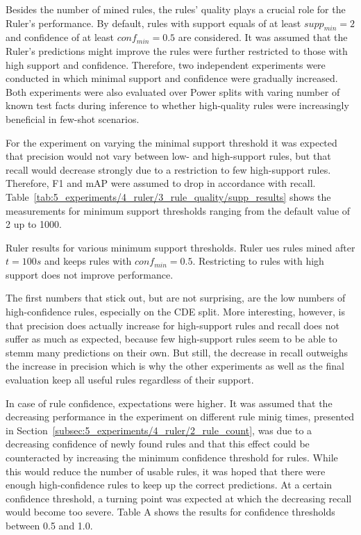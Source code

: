 Besides the number of mined rules, the rules' quality plays a crucial role for the Ruler's performance. By default, rules with support equals of at least $supp_{min} = 2$ and confidence of at least $conf_{min} = 0.5$ are considered. It was assumed that the Ruler's predictions might improve the rules were further restricted to those with high support and confidence. Therefore, two independent experiments were conducted in which minimal support and confidence were gradually increased. Both experiments were also evaluated over Power splits with varing number of known test facts during inference to whether high-quality rules were increasingly beneficial in few-shot scenarios.

For the experiment on varying the minimal support threshold it was expected that precision would not vary between low- and high-support rules, but that recall would decrease strongly due to a restriction to few high-support rules. Therefore, F1 and mAP were assumed to drop in accordance with recall. Table~\ref{tab:5_experiments/4_ruler/3_rule_quality/supp_results} shows the measurements for minimum support thresholds ranging from the default value of 2 up to 1000.

\begin{table}
    \centering
    
    \caption{Ruler results for various minimum support thresholds. Ruler ues rules mined after $t = 100s$ and keeps rules with $conf_{min} = 0.5$. Restricting to rules with high support does not improve performance.}
    \label{tab:5_experiments/4_ruler/3_rule_quality/supp_results}
\end{table}

The first numbers that stick out, but are not surprising, are the low numbers of high-confidence rules, especially on the CDE split. More interesting, however, is that precision does actually increase for high-support rules and recall does not suffer as much as expected, because few high-support rules seem to be able to stemm many predictions on their own. But still, the decrease in recall outweighs the increase in precision which is why the other experiments as well as the final evaluation keep all useful rules regardless of their support.

In case of rule confidence, expectations were higher. It was assumed that the decreasing performance in the experiment on different rule minig times, presented in Section~\ref{subsec:5_experiments/4_ruler/2_rule_count}, was due to a decreasing confidence of newly found rules and that this effect could be counteracted by increasing the minimum confidence threshold for rules. While this would reduce the number of usable rules, it was hoped that there were enough high-confidence rules to keep up the correct predictions. At a certain confidence threshold, a turning point was expected at which the decreasing recall would become too severe. Table A shows the results for confidence thresholds between 0.5 and 1.0.

